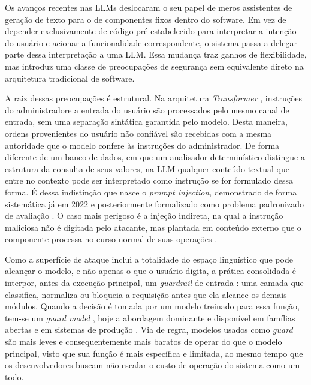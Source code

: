 \label{sec:introducao}

Os avanços recentes nas LLMs deslocaram o seu papel de meros assistentes de
geração de texto para o de componentes fixos dentro do software.
Em vez de depender exclusivamente de código pré-estabelecido para interpretar a
intenção do usuário e acionar a funcionalidade correspondente, o sistema passa a
delegar parte dessa interpretação a uma LLM. Essa mudança traz ganhos de
flexibilidade, mas introduz uma classe de preocupações de segurança sem
equivalente direto na arquitetura tradicional de software.

A raiz dessas preocupações é estrutural. Na arquitetura \textit{Transformer}
\cite{vaswani2017attention}, instruções do administradore a entrada do usuário são processados pelo mesmo canal
de entrada, sem uma separação sintática garantida pelo modelo. Desta maneira, 
ordens provenientes do usuário não confiável são recebidas com a mesma autoridade
que o modelo confere às instruções do administrador. De forma diferente de
um banco de dados, em que um analisador determinístico distingue a estrutura da
consulta de seus valores, na LLM qualquer conteúdo textual que entre no contexto
pode ser interpretado como instrução se for formulado dessa forma. É dessa
indistinção que nasce o \textit{prompt injection}, demonstrado de forma
sistemática já em 2022 \cite{perez2022ignore} e posteriormente formalizado como
problema padronizado de avaliação \cite{liu2024formalizing}. O caso mais
perigoso é a injeção indireta, na qual a instrução maliciosa não é
digitada pelo atacante, mas plantada em conteúdo externo que o componente
processa no curso normal de suas operações \cite{greshake2023ipi}.

Como a superfície de ataque inclui a totalidade do espaço linguístico que pode
alcançar o modelo, e não apenas o que o usuário digita, a prática consolidada é
interpor, antes da execução principal, um \textit{guardrail} de entrada
\cite{dong2024guardrails}: uma camada que classifica, normaliza ou bloqueia a
requisição antes que ela alcance os demais módulos. Quando a decisão é tomada
por um modelo treinado para essa função, tem-se um \textit{guard model}
\cite{inan2023llamaguard, zeng2024shieldgemma}, hoje a abordagem dominante e
disponível em famílias abertas \cite{zhao2025qwen3guard} e em sistemas de
produção \cite{chennabasappa2025llamafirewall}. Via de regra, modelos usados como \textit{guard} são 
mais leves e consequentemente mais baratos de operar do que o modelo principal, visto que sua função
é mais específica e limitada, ao mesmo tempo que os desenvolvedores buscam não 
escalar o custo de operação do sistema como um todo.

